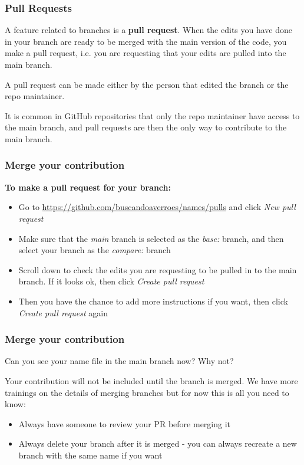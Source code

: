 \documentclass[aspectratio=169]{beamer} %
\newcommand{\trainingURL}[1]{{\color{blue}\url{#1}}}
\newcommand{\traininerUsername}{buscandoaverroes}
\newcommand{\repoName}{\traininerUsername/names}
\newcommand{\trainingRepoURL}[1]{\trainingURL{https://github.com/\repoName #1}}
\begin{document}
\begin{frame}
\frametitle{Pull Requests}

	A feature related to branches is a \textbf{pull request}.
	When the edits you have done in your branch
	are ready to be merged with the main version of the code,
	you make a pull request, i.e. you are requesting that
	your edits are pulled into the main branch.


	A pull request can be made either by the person that edited the branch or the repo maintainer.

	It is common in GitHub repositories that only the repo maintainer have access to the main branch, and pull requests are then the only way to contribute to the main branch.


\end{frame}

\begin{frame}
\frametitle{Merge your contribution}

	\textbf{To make a pull request for your branch:}
	\begin{itemize}
		\item Go to \trainingRepoURL{/pulls} and click \textit{New pull request}
		\item Make sure that the \textit{main} branch is selected as the \textit{base:} branch, and then select your branch as the \textit{compare:} branch
		\item Scroll down to check the edits you are requesting to be pulled in to the main branch. If it looks ok, then click \textit{Create pull request}
		\item Then you have the chance to add more instructions if you want, then click \textit{Create pull request} again
	\end{itemize}
\end{frame}

\begin{frame}
\frametitle{Merge your contribution}

Can you see your name file in the main branch now? Why not?

\vspace{.5cm}

Your contribution will not be included until the branch is merged. We have more trainings on the details of merging branches but for now this is all you need to know:

	\begin{itemize}
		\item Always have someone to review your PR before merging it
		\item Always delete your branch after it is merged - you can always recreate a new branch with the same name if you want
	\end{itemize}

\end{frame}
\end{document}
